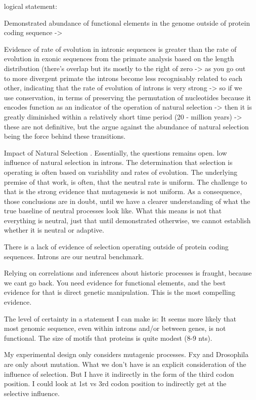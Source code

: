 logical statement: 

Demonstrated abundance of functional elements in the genome outside of protein coding sequence ->

Evidence of rate of evolution in intronic sequences is greater than the rate of evolution in exonic sequences from the primate analysis based on the length distribution (there's overlap but its mostly to the right of zero -> as you go out to more divergent primate the introns become less recognisably related to each other, indicating that the rate of evolution of introns is very strong -> so if we use conservation, in terms of preserving the permutation of nucleotides because it encodes function as an indicator of the operation of natural selection -> then it is greatly diminished within a relatively short time period (20 - million years) -> these are not definitive, but the argue against the abundance of natural selection being the force behind these transitions.

Impact of Natural Selection \cite{Graur2013OnENCODE}. Essentially, the questions remains open. 
low influence of natural selection in introns. 
The determination that selection is operating is often based on variability and rates of evolution. The underlying premise of that work, is often, that the neutral rate is uniform. The challenge to that is the strong evidence that mutagenesis is not uniform. As a consequence, those conclusions are in doubt, until we have a clearer understanding of what the true baseline of neutral processes look like. What this means is not that everything is neutral, just that until demonstrated otherwise, we cannot establish whether it is neutral or adaptive. 

There is a lack of evidence of selection operating outside of protein coding sequences. 
Introns are our neutral benchmark. 

Relying on correlations and inferences about historic processes is fraught, because we cant go back. You need evidence for functional elements, and the best evidence for that is direct genetic manipulation. This is the most compelling evidence.

The level of certainty in a statement I can make is:
It seems more likely that most genomic sequence, even within introns and/or between genes, is not functional. The size of motifs that proteins is quite modest (8-9 nts). 

My experimental design only considers mutagenic processes. Fxy and Drosophila are only about mutation. What we don't have is an explicit consideration of the influence of selection. But I have it indirectly in the form of the third codon position. I could look at 1st vs 3rd codon position to indirectly get at the selective influence. 

